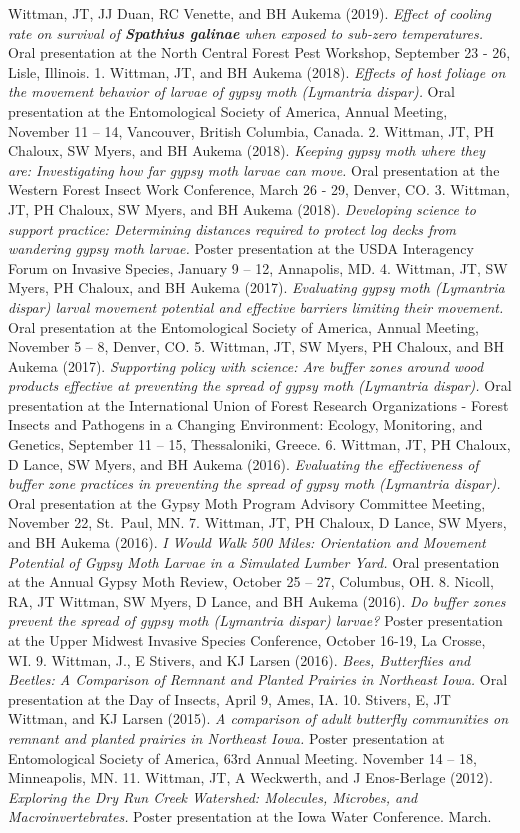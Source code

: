 \documentclass[11pt, a4paper]{awesome-cv}
\begin{document}
Wittman, JT, JJ Duan, RC Venette, and BH Aukema (2019). \emph{Effect of
cooling rate on survival of \textbf{Spathius galinae} when exposed to
sub-zero temperatures.} Oral presentation at the North Central Forest
Pest Workshop, September 23 - 26, Lisle, Illinois. 1. Wittman, JT, and
BH Aukema (2018). \emph{Effects of host foliage on the movement behavior
of larvae of gypsy moth (Lymantria dispar).} Oral presentation at the
Entomological Society of America, Annual Meeting, November 11 -- 14,
Vancouver, British Columbia, Canada. 2. Wittman, JT, PH Chaloux, SW
Myers, and BH Aukema (2018). \emph{Keeping gypsy moth where they are:
Investigating how far gypsy moth larvae can move.} Oral presentation at
the Western Forest Insect Work Conference, March 26 - 29, Denver, CO. 3.
Wittman, JT, PH Chaloux, SW Myers, and BH Aukema (2018).
\emph{Developing science to support practice: Determining distances
required to protect log decks from wandering gypsy moth larvae.} Poster
presentation at the USDA Interagency Forum on Invasive Species, January
9 -- 12, Annapolis, MD. 4. Wittman, JT, SW Myers, PH Chaloux, and BH
Aukema (2017). \emph{Evaluating gypsy moth (Lymantria dispar) larval
movement potential and effective barriers limiting their movement.} Oral
presentation at the Entomological Society of America, Annual Meeting,
November 5 -- 8, Denver, CO. 5. Wittman, JT, SW Myers, PH Chaloux, and
BH Aukema (2017). \emph{Supporting policy with science: Are buffer zones
around wood products effective at preventing the spread of gypsy moth
(Lymantria dispar).} Oral presentation at the International Union of
Forest Research Organizations - Forest Insects and Pathogens in a
Changing Environment: Ecology, Monitoring, and Genetics, September 11 --
15, Thessaloniki, Greece. 6. Wittman, JT, PH Chaloux, D Lance, SW Myers,
and BH Aukema (2016). \emph{Evaluating the effectiveness of buffer zone
practices in preventing the spread of gypsy moth (Lymantria dispar).}
Oral presentation at the Gypsy Moth Program Advisory Committee Meeting,
November 22, St.~Paul, MN. 7. Wittman, JT, PH Chaloux, D Lance, SW
Myers, and BH Aukema (2016). \emph{I Would Walk 500 Miles: Orientation
and Movement Potential of Gypsy Moth Larvae in a Simulated Lumber Yard.}
Oral presentation at the Annual Gypsy Moth Review, October 25 -- 27,
Columbus, OH. 8. Nicoll, RA, JT Wittman, SW Myers, D Lance, and BH
Aukema (2016). \emph{Do buffer zones prevent the spread of gypsy moth
(\emph{Lymantria dispar}) larvae?} Poster presentation at the Upper
Midwest Invasive Species Conference, October 16-19, La Crosse, WI. 9.
Wittman, J., E Stivers, and KJ Larsen (2016). \emph{Bees, Butterflies
and Beetles: A Comparison of Remnant and Planted Prairies in Northeast
Iowa.} Oral presentation at the Day of Insects, April 9, Ames, IA. 10.
Stivers, E, JT Wittman, and KJ Larsen (2015). \emph{A comparison of
adult butterfly communities on remnant and planted prairies in Northeast
Iowa.} Poster presentation at Entomological Society of America, 63rd
Annual Meeting. November 14 -- 18, Minneapolis, MN. 11. Wittman, JT, A
Weckwerth, and J Enos-Berlage (2012). \emph{Exploring the Dry Run Creek
Watershed: Molecules, Microbes, and Macroinvertebrates.} Poster
presentation at the Iowa Water Conference. March.
\end{document}
